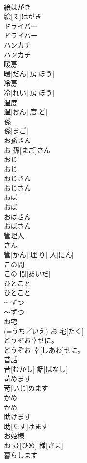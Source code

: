 \documentclass[8pt]{extreport}
\begin{document}
\begin{CJK}{UTF8}{min}
\\	絵はがき	
\\	絵[え]はがき		
\\	ドライバー	
\\	ドライバー		
\\	ハンカチ	
\\	ハンカチ		
\\	暖房	
\\	暖[だん] 房[ぼう]		
\\	冷房	
\\	冷[れい] 房[ぼう]		
\\	温度	
\\	温[おん] 度[ど]		
\\	孫	
\\	孫[まご]		
\\	お孫さん	
\\	お 孫[まご]さん		
\\	おじ	
\\	おじ		
\\	おじさん	
\\	おじさん		
\\	おば	
\\	おば		
\\	おばさん	
\\	おばさん		
\\	管理人	
\\	さん 
\\	管[かん] 理[り] 人[にん]		
\\	この間	
\\	この 間[あいだ]		
\\	ひとこと	
\\	ひとこと		
\\	～ずつ	
\\	～ずつ		
\\	お宅	
\\	(=うち／いえ)	お 宅[たく]		
\\	どうぞお幸せに。	
\\	どうぞお 幸[しあわ]せに。		
\\	昔話	
\\	昔[むかし] 話[ばなし]		
\\	苛めます	
\\	苛[いじ]めます		
\\	かめ	
\\	かめ		
\\	助けます	
\\	助[たす]けます		
\\	お姫様	
\\	お 姫[ひめ] 様[さま]		
\\	暮らします	

\end{CJK}
\end{document}
